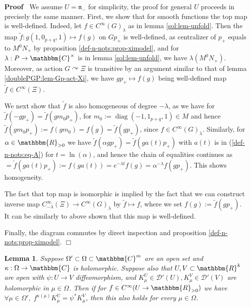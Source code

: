 \documentclass{article}
\newcommand{\assign}{:=}
\newcommand{\tmop}[1]{\ensuremath{\operatorname{#1}}}
\newenvironment{proof}{\noindent\textbf{Proof\ }}{\hspace*{\fill}$\Box$\medskip}
\numberwithin{definition}{section}
\newtheorem{lemma}{Lemma}
\numberwithin{lemma}{section}
\numberwithin{proposition}{section}
{\theorembodyfont{\rmfamily}\newtheorem{remark}{Remark}
\numberwithin{remark}{section}
}
\begin{document}
\begin{proof}
  We assume $U =\mathfrak{n}_-$ for simplicity, the proof for general $U$
  proceeds in precisely the same manner. First, we show that for smooth
  functions the top map is well-defined. Indeed, let $f \in C^{\infty} (
  G)_{\lambda} $ as in lemma \ref{sol:lem-unfold}. Then the map $\tilde{f} : g
  ( 1, 0_{p + q}, 1) \mapsto f ( g)$ on $G p_+$ is well-defined, as
  centralizer of $p_+$ equals to $M^0 N_+$ by proposition
  \ref{def-n-nots:prop-ximodel}, and for $\lambda : P \rightarrow
  \mathbbm{C}^{\times}$ is in lemma \ref{sol:lem-unfold}, we have $\lambda (
  M^0 N_+)$. Moreover, as action $G \curvearrowright \Xi$ is transitive by an
  argument similar to that of lemma \ref{doublePGP:lem-Gp-act-Xi}, we have $g
  p_+ \mapsto f ( g)$ being well-defined map $\tilde{f} \in C^{\infty} (
  \Xi)$.
  
  We next show that $\tilde{f}$ is also homogeneous of degree $- \lambda$, as
  we have for $\tilde{f} ( - g p_+) = \tilde{f} ( g m_0 p_+)$, for $m_0
  \assign \tmop{diag} ( - 1, 1_{p + q}, 1) \in M$ and hence $\tilde{f} ( g m_0
  p_+) \assign f ( g m_0) = f ( g_{}) = \tilde{f} ( g p_+)$, since $f \in
  C^{\infty} ( G)_{\lambda}$. Similarly, for $\alpha \in \mathbbm{R}_{> 0}$ we
  have $\tilde{f} ( \alpha g p_+) = \tilde{f} ( g a ( t) p_+)$ with $a ( t)$
  is in (\ref{def-n-nots:eq-A}) for $t = \ln ( \alpha)$, and hence the chain
  of equalities continues as $= \tilde{f} ( g a ( t) p_+) \assign f ( g a (
  t)) = e^{- \lambda t} f ( g) = \alpha^{- \lambda} f ( g p_+)$. This shows
  homogeneity.
  
  The fact that top map is isomorphic is implied by the fact that we can
  construct inverse map $C^{\infty}_{- \lambda} ( \Xi) \rightarrow C^{\infty}
  ( G)_{\lambda}$ by $\tilde{f} \mapsto f$, where we set $f ( g) \assign
  \tilde{f} ( g p_+)$. It can be similarly to above shown that this map is
  well-defined.
  
  Finally, the diagram commutes by direct inspection and proposition
  \ref{def-n-nots:prop-ximodel}.
\end{proof}

\begin{lemma}
  \label{sol:lem-holodep}Suppose $\Omega' \subset \Omega \subset
  \mathbbm{C}^m$ are an open set and $\kappa : \Omega \rightarrow \mathbbm{C}$
  is holomorphic. Suppose also that $U, V \subset \mathbbm{R}^k$ are open with
  $\psi : U \rightarrow V$ diffeomorphism, and $K_{\mu}^U \in \mathcal{D}' (
  U), K^V_{\mu} \in \mathcal{D}' ( V)$ are holomorphic in $\mu \in \Omega$.
  Then if for $f \in C^{\infty} ( U \rightarrow \mathbbm{R}_{> 0})$ we have
  $\forall \mu \in \Omega', \; f^{\kappa ( \mu)} K^U_{\mu} = \psi^{\ast}
  K^V_{\mu}$, then this also holds for every $\mu \in \Omega$.
\end{lemma}
\end{document}
